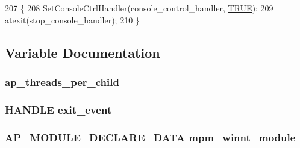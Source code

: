 \begin{DoxyCode}
207 \{
208     SetConsoleCtrlHandler(console\_control\_handler, \hyperlink{group__MOD__SSL__PRIVATE_gaa8cecfc5c5c054d2875c03e77b7be15d}{TRUE});
209     atexit(stop\_console\_handler);
210 \}
\end{DoxyCode}


\subsection{Variable Documentation}
\subsubsection[{\texorpdfstring{ap\+\_\+threads\+\_\+per\+\_\+child}{ap_threads_per_child}}]{ ap\+\_\+threads\+\_\+per\+\_\+child}\hypertarget{group__APACHE__MPM__WINNT_ga1444d83d8c7bcd159d8af4065ded7e2c}{}\label{group__APACHE__MPM__WINNT_ga1444d83d8c7bcd159d8af4065ded7e2c}
\subsubsection[{\texorpdfstring{exit\+\_\+event}{exit_event}}]{\setlength{\rightskip}{0pt plus 5cm}H\+A\+N\+D\+LE exit\+\_\+event}\hypertarget{group__APACHE__MPM__WINNT_gad98010720fc07c0fae435d2fbe843a69}{}\label{group__APACHE__MPM__WINNT_gad98010720fc07c0fae435d2fbe843a69}
\subsubsection[{\texorpdfstring{mpm\+\_\+winnt\+\_\+module}{mpm_winnt_module}}]{ {\bf A\+P\+\_\+\+M\+O\+D\+U\+L\+E\+\_\+\+D\+E\+C\+L\+A\+R\+E\+\_\+\+D\+A\+TA} mpm\+\_\+winnt\+\_\+module}\hypertarget{group__APACHE__MPM__WINNT_ga61813b6994442d70c7f29194efae11a3}{}\label{group__APACHE__MPM__WINNT_ga61813b6994442d70c7f29194efae11a3}
